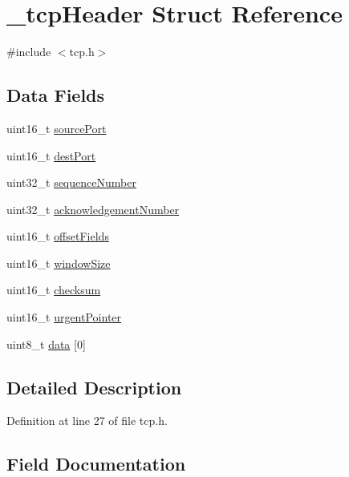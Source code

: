\hypertarget{struct__tcpHeader}{}\section{\+\_\+tcp\+Header Struct Reference}
\label{struct__tcpHeader}


{\ttfamily \#include $<$tcp.\+h$>$}

\subsection*{Data Fields}
\begin{DoxyCompactItemize}
\item 
uint16\+\_\+t \hyperlink{struct__tcpHeader_adab3cbb36f879d6bbb9511cbed24b7a5}{source\+Port}
\item 
uint16\+\_\+t \hyperlink{struct__tcpHeader_a5484a2aa2e860b1f226a7014ae402d3e}{dest\+Port}
\item 
uint32\+\_\+t \hyperlink{struct__tcpHeader_a5441a14212cd0e07d20b95ce8198db27}{sequence\+Number}
\item 
uint32\+\_\+t \hyperlink{struct__tcpHeader_a99a7268547ba31c3fe8e44933d435389}{acknowledgement\+Number}
\item 
uint16\+\_\+t \hyperlink{struct__tcpHeader_ad3fe63661ec8dea7e4a46bf010788384}{offset\+Fields}
\item 
uint16\+\_\+t \hyperlink{struct__tcpHeader_ab3caec0ac5bef36c592a52b800f73e5b}{window\+Size}
\item 
uint16\+\_\+t \hyperlink{struct__tcpHeader_a0906fe118aa70365e0820e171c75119b}{checksum}
\item 
uint16\+\_\+t \hyperlink{struct__tcpHeader_a971349f17dd591d019c1e12c1454998f}{urgent\+Pointer}
\item 
uint8\+\_\+t \hyperlink{struct__tcpHeader_aede9eb26ef4f1a85dc3491029ee4baac}{data} \mbox{[}0\mbox{]}
\end{DoxyCompactItemize}


\subsection{Detailed Description}


Definition at line 27 of file tcp.\+h.



\subsection{Field Documentation}
\mbox{\label{struct__tcpHeader_a99a7268547ba31c3fe8e44933d435389}} 

